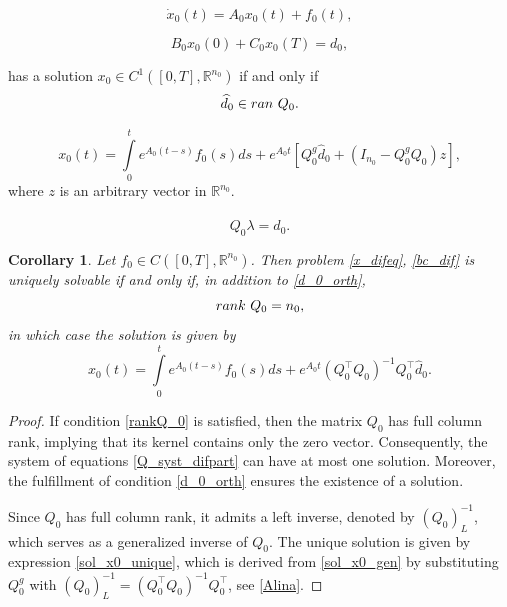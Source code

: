 \documentclass[10pt,a4paper]{amsart}
\newtheorem{corollary}{Corollary}
\begin{document}
\begin{equation}\label{x_difeq}\dot{x}_0(t)=A_0x_0(t)+f_0(t), \end{equation}

   \begin{equation}\label{bc_dif}
    B_0x_0(0)+C_0x_0(T)=d_0,\end{equation}

has a solution $x_0\in C^1([0,T],\mathbb{R}^{n_0})$ if and only if \begin{equation}\label{d_0_orth}
    \widehat{d}_0\in \textnormal{ran}~ Q_0.
    \end{equation}

\begin{equation}\label{sol_x0_gen}
    x_0(t)=\int\limits_0^t e^{A_0(t-s)}f_0(s)ds+e^{A_0t}\left[Q_0^g\widehat{d}_0+(I_{n_0}-Q_0^g Q_0)z\right],
\end{equation} where  $z$ is an arbitrary vector in $\mathbb{R}^{n_0}$.

\begin{equation}\label{Q_syst_difpart}
    Q_0\lambda=\widehat{d}_0.
\end{equation}

\begin{corollary}\label{corollary_ODEpart_uniqueness}
  Let $f_0\in C([0,T],\mathbb{R}^{n_0})$. Then problem \eqref{x_difeq}, \eqref{bc_dif} is uniquely solvable if and only if, in addition to \eqref{d_0_orth},
\begin{equation}\label{rankQ_0}
    \emph{rank}~Q_0=n_0,
\end{equation}
in which case the solution is given by
\begin{equation}\label{sol_x0_unique}
    x_0(t)=\int\limits_0^t e^{A_0(t-s)}f_0(s)ds+e^{A_0t}(Q_0^\top Q_0)^{-1}Q_0^\top\widehat{d}_0.
\end{equation}
\end{corollary}

\begin{proof}
If condition \eqref{rankQ_0} is satisfied, then the matrix $Q_0$ has full column rank, implying that its kernel contains only the zero vector. Consequently, the system of equations  \eqref{Q_syst_difpart} can have at most one solution. Moreover, the fulfillment of condition \eqref{d_0_orth} ensures the existence of a solution.

Since $Q_0$ has full column rank, it admits a left inverse, denoted by $(Q_0)_L^{-1}$, which serves as a generalized inverse of  $Q_0$.
The unique solution is given by expression \eqref{sol_x0_unique}, which is derived from \eqref{sol_x0_gen} by substituting $Q_0^g$ with
$(Q_0)_L^{-1}=(Q_0^\top Q_0)^{-1}Q_0^\top$, see
\eqref{Alina}.
\end{proof}
\end{document}
